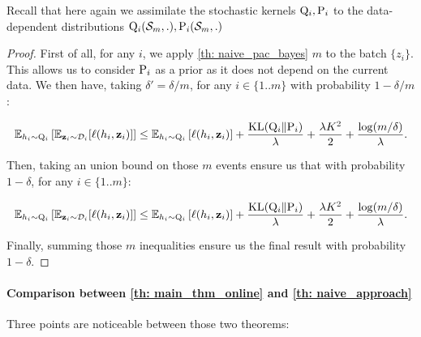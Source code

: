 Recall that here again we assimilate the stochastic kernels $\Q_{i}, \P_{i}$ to the data-dependent distributions $\Q_{i}(\Sm,.), \P_{i}(\Sm,.)$

\begin{proof}
  First of all, for any $i$, we apply \cref{th: naive_pac_bayes} $m$ to the batch $\{ z_i\}$. This allows us to consider $\P_{i}$ as a prior as it does not depend on the current data. We then have, taking $\delta'=\delta/m$, for any $i\in\{1..m\}$ with probability $ 1- \delta/m$:

  \[ \mathbb{E}_{h_i\sim \Q_{i}}\left[ \mathbb{E}_{\z_i\sim \D_i}[\ell(h_i,\z_i)]    \right] \leq  \mathbb{E}_{h_i\sim \Q_{i}}\left[ \ell(h_i,\z_i) \right] +
  \frac{\operatorname{KL}(\Q_{i}\| \P_{i})}{\lambda} + \frac{\lambda K^2}{2} + \frac{\log(m/\delta)}{\lambda}. \]

  Then, taking an union bound on those $m$ events ensure us that with probability $1-\delta$, for any $i\in\{1..m\}$:

  \[ \mathbb{E}_{h_i\sim \Q_{i}}\left[ \mathbb{E}_{\z_i\sim \D_i}[\ell(h_i,\z_i)]    \right] \leq  \mathbb{E}_{h_i\sim \Q_{i}}\left[ \ell(h_i,\z_i) \right] +
  \frac{\operatorname{KL}(\Q_{i}\| \P_{i})}{\lambda} + \frac{\lambda  K^2}{2} + \frac{\log(m/\delta)}{\lambda}. \]


  Finally, summing those $m$ inequalities ensure us the final result with probability $1-\delta$.

\end{proof}

\paragraph{Comparison between \cref{th: main_thm_online} and \cref{th: naive_approach}}   Three points are noticeable between those two theorems:

